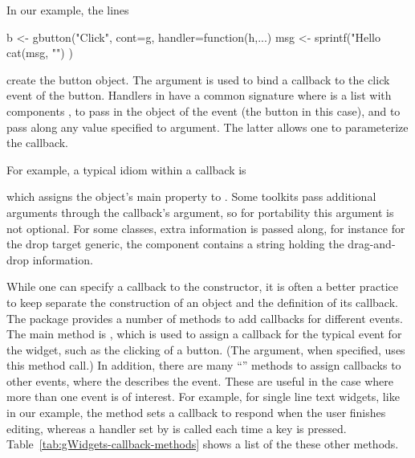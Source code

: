 In our example, the lines
\begin{Schunk}
\begin{Sinput}
 b <- gbutton("Click", cont=g, handler=function(h,...) {
   msg <- sprintf("Hello %
   cat(msg, "\n")
 })
\end{Sinput}
\end{Schunk}
create the button object. The argument  is used to bind a
callback to the click event of the button. Handlers in 
have a common signature  where  is a list with
components , to pass in the object of the event (the button
in this case), and
 to pass along any value specified to 
argument. The latter allows one to parameterize the callback. 

For example, a typical idiom within a callback is
\begin{Schunk}
\end{Schunk}
%
which assigns the object's main property to .  Some
toolkits pass additional arguments through the callback's 
argument, so for portability this argument is not optional. For some
classes, extra information is passed along, for instance for the drop
target generic, the component  contains a string
holding the drag-and-drop information.


While one can specify a callback to the constructor, it is often a
better practice to keep separate the construction of an object and the
definition of its callback.  The package provides a number of methods
to add callbacks for different events. The main method is
, which is used to assign a callback for the
typical event for the widget, such as the clicking of a button. (The
 argument, when specified, uses this method call.)  In
addition, there are many ``'' methods to assign
callbacks to other events, where the  describes the
event. These are useful in the case where more than one event is of
interest. For example, for single line text widgets, like  in
our example, the  method sets a callback to
respond when the user finishes editing, whereas a handler set by
 is called each time a key is pressed.
Table~\ref{tab:gWidgets-callback-methods} shows a list of the these
other methods.

